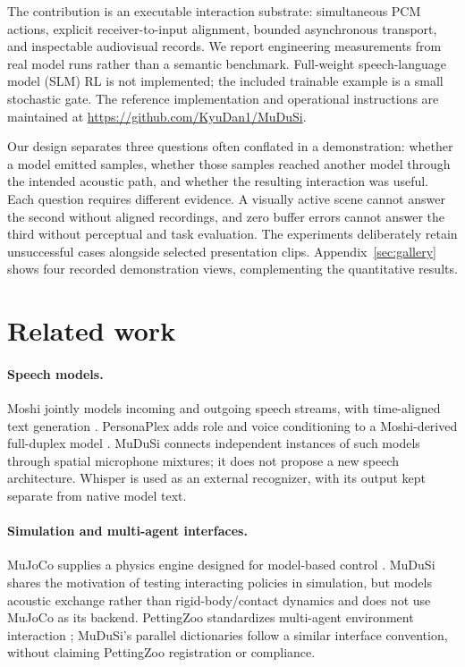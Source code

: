 \documentclass{article}
\begin{document}
The contribution is an executable interaction substrate: simultaneous PCM actions, explicit receiver-to-input alignment, bounded asynchronous transport, and inspectable audiovisual records. We report engineering measurements from real model runs rather than a semantic benchmark. Full-weight speech-language model (SLM) RL is not implemented; the included trainable example is a small stochastic gate. The reference implementation and operational instructions are maintained at \url{https://github.com/KyuDan1/MuDuSi}.

Our design separates three questions often conflated in a demonstration: whether a model emitted samples, whether those samples reached another model through the intended acoustic path, and whether the resulting interaction was useful. Each question requires different evidence. A visually active scene cannot answer the second without aligned recordings, and zero buffer errors cannot answer the third without perceptual and task evaluation. The experiments deliberately retain unsuccessful cases alongside selected presentation clips. Appendix~\ref{sec:gallery} shows four recorded demonstration views, complementing the quantitative results.

\section{Related work}
\paragraph{Speech models.} Moshi jointly models incoming and outgoing speech streams, with time-aligned text generation \citep{defossez2024moshi}. PersonaPlex adds role and voice conditioning to a Moshi-derived full-duplex model \citep{roy2026personaplex}. MuDuSi connects independent instances of such models through spatial microphone mixtures; it does not propose a new speech architecture. Whisper \citep{radford2023whisper} is used as an external recognizer, with its output kept separate from native model text.

\paragraph{Simulation and multi-agent interfaces.} MuJoCo supplies a physics engine designed for model-based control \citep{todorov2012mujoco}. MuDuSi shares the motivation of testing interacting policies in simulation, but models acoustic exchange rather than rigid-body/contact dynamics and does not use MuJoCo as its backend. PettingZoo standardizes multi-agent environment interaction \citep{terry2020pettingzoo}; MuDuSi's parallel dictionaries follow a similar interface convention, without claiming PettingZoo registration or compliance.
\end{document}
